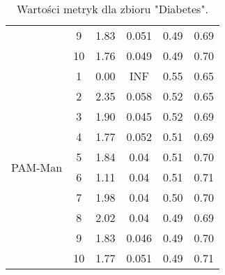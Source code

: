 \begin{table}[H]
\begin{tabular}{cc|cccc}
  & 9 & 1.83 & 0.051 & 0.49 & 0.69 \\ 
  & 10 & 1.76 & 0.049 & 0.49 & 0.70 \\ \hline \hline
  \multirow{10}{*}{PAM-Man} & 1 & 0.00 & INF & 0.55 & 0.65 \\ 
  & 2 & 2.35 & 0.058 & 0.52 & 0.65 \\ 
  & 3 & 1.90 & 0.045 & 0.52 & 0.69 \\ 
  & 4 & 1.77 & 0.052 & 0.51 & 0.69 \\ 
  & 5 & 1.84 & 0.04 & 0.51 & 0.70 \\ 
  & 6 & 1.11 & 0.04 & 0.51 & 0.71 \\ 
  & 7 & 1.98 & 0.04 & 0.50 & 0.70 \\ 
  & 8 & 2.02 & 0.04 & 0.49 & 0.69 \\ 
  & 9 & 1.83 & 0.046 & 0.49 & 0.70 \\ 
  & 10 & 1.77 & 0.051 & 0.49 & 0.71 \\ 
   \hline
\end{tabular}
  \caption{Wartości metryk dla zbioru "Diabetes".}
\end{table}
